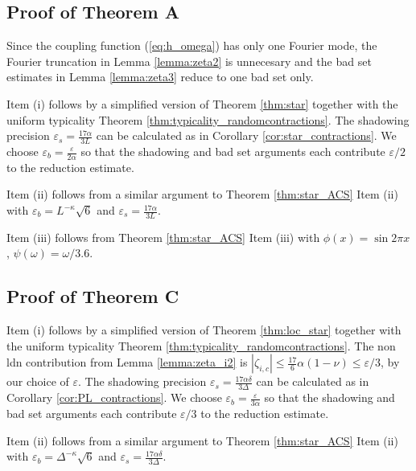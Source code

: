\documentclass[a4paper]{article}
\theoremstyle{plain}
\theoremstyle{definition}
\begin{document}
\subsection{Proof of Theorem A} \label{sec:proof_theorem_A}
Since the coupling function (\ref{eq:h_omega}) has only one Fourier mode, the Fourier truncation in Lemma \ref{lemma:zeta2} is unnecesary and the bad set estimates in Lemma \ref{lemma:zeta3} reduce to one bad set only. 

Item (i) follows by a simplified version of Theorem \ref{thm:star} together with the uniform typicality Theorem \ref{thm:typicality_randomcontractions}. The shadowing precision $\varepsilon_s=\frac{17\alpha}{3L}$ can be calculated as in Corollary \ref{cor:star_contractions}. We choose $\varepsilon_b=\frac{\varepsilon}{2\alpha}$ so that the shadowing and bad set arguments each contribute $\varepsilon/2$ to the reduction estimate.

Item (ii) follows from a similar argument to Theorem \ref{thm:star_ACS} Item (ii) with $\varepsilon_b=L^{-\kappa}\sqrt{6}$ and $\varepsilon_s=\frac{17\alpha}{3L}$.

Item (iii) follows from Theorem \ref{thm:star_ACS} Item (iii) with $\phi(x)=\sin 2\pi x$, $\psi(\omega)=\omega/3.6$.

\subsection{Proof of Theorem C}\label{sec:proof_theorem_C}
Item (i) follows by a simplified version of Theorem \ref{thm:loc_star} together with the uniform typicality Theorem \ref{thm:typicality_randomcontractions}. The non ldn contribution from Lemma \ref{lemma:zeta_i2} is $|\zeta_{i,c}|\leq \frac{17}{6}\alpha(1-\nu)\leq \varepsilon/3$, by our choice of $\varepsilon$. The shadowing precision $\varepsilon_s=\frac{17\alpha \delta}{3\Delta}$ can be calculated as in Corollary \ref{cor:PL_contractions}. We choose $\varepsilon_b=\frac{\varepsilon}{3\alpha}$ so that the shadowing and bad set arguments each contribute $\varepsilon/3$ to the reduction estimate.

Item (ii) follows from a similar argument to Theorem \ref{thm:star_ACS} Item (ii) with $\varepsilon_b=\Delta^{-\kappa}\sqrt{6}$ and $\varepsilon_s=\frac{17\alpha\delta}{3\Delta}$.
\end{document}

